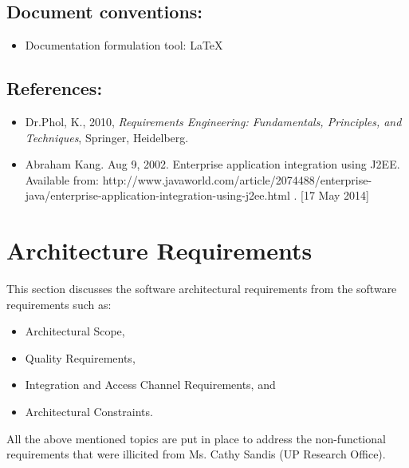 \documentclass[12pt]{article}
\newcommand{\client}{Ms. Cathy Sandis (UP Research Office)}
\begin{document}
\vspace{0.5in}

\subsection{Document conventions:}
\vspace{0.1in}
\begin{itemize}
\item Documentation formulation tool: LaTeX
\end{itemize}

\vspace{0.2in}

\subsection{References:}
\vspace{0.1in}
\begin{itemize}
\item Dr.Phol, K., 2010, \textit{Requirements Engineering: Fundamentals, Principles, and Techniques}, Springer, Heidelberg.
\item Abraham Kang. Aug 9, 2002. Enterprise application integration using J2EE. Available from: http://www.javaworld.com/article/2074488/enterprise-java/enterprise-application-integration-using-j2ee.html . [17 May 2014]
\end{itemize}	

\vspace{0.5in}

\newpage

\section{Architecture Requirements} 
This section discusses the software architectural requirements from the software requirements such as:
\begin{itemize}
\item Architectural Scope,
\item Quality Requirements,
\item Integration and Access Channel Requirements, and
\item Architectural Constraints.
\end{itemize}
All the above mentioned topics are put in place to address the non-functional requirements that were illicited from \client .
\end{document}
